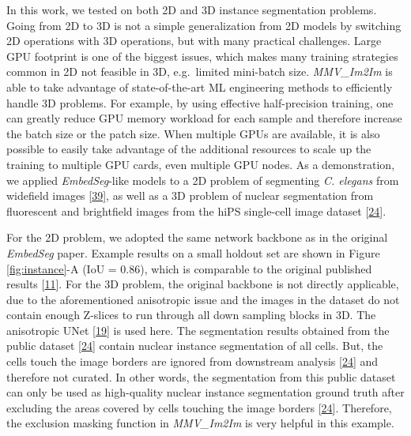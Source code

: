 In this work, we tested on both 2D and 3D instance segmentation problems. Going from 2D to 3D is not a simple generalization from 2D models by switching 2D operations with 3D operations, but with many practical challenges. Large GPU footprint is one of the biggest issues, which makes many training strategies common in 2D not feasible in 3D, e.g.~limited mini-batch size. \emph{MMV\_Im2Im} is able to take advantage of state-of-the-art ML engineering methods to efficiently handle 3D problems. For example, by using effective half-precision training, one can greatly reduce GPU memory workload for each sample and therefore increase the batch size or the patch size. When multiple GPUs are available, it is also possible to easily take advantage of the additional resources to scale up the training to multiple GPU cards, even multiple GPU nodes. As a demonstration, we applied \emph{EmbedSeg}-like models to a 2D problem of segmenting \emph{C. elegans} from widefield images {[}\protect\hyperlink{ref-138foKNOh}{39}{]}, as well as a 3D problem of nuclear segmentation from fluorescent and brightfield images from the hiPS single-cell image dataset {[}\protect\hyperlink{ref-5sGcmDuy}{24}{]}.

For the 2D problem, we adopted the same network backbone as in the original \emph{EmbedSeg} paper. Example results on a small holdout set are shown in Figure \ref{fig:instance}-A (IoU = 0.86), which is comparable to the original published results {[}\protect\hyperlink{ref-QmYuUQ5K}{11}{]}. For the 3D problem, the original backbone is not directly applicable, due to the aforementioned anisotropic issue and the images in the dataset do not contain enough Z-slices to run through all down sampling blocks in 3D. The anisotropic UNet {[}\protect\hyperlink{ref-jM3v1UjQ}{19}{]} is used here. The segmentation results obtained from the public dataset {[}\protect\hyperlink{ref-5sGcmDuy}{24}{]} contain nuclear instance segmentation of all cells. But, the cells touch the image borders are ignored from downstream analysis {[}\protect\hyperlink{ref-5sGcmDuy}{24}{]} and therefore not curated. In other words, the segmentation from this public dataset can only be used as high-quality nuclear instance segmentation ground truth after excluding the areas covered by cells touching the image borders {[}\protect\hyperlink{ref-5sGcmDuy}{24}{]}. Therefore, the exclusion masking function in \emph{MMV\_Im2Im} is very helpful in this example.

